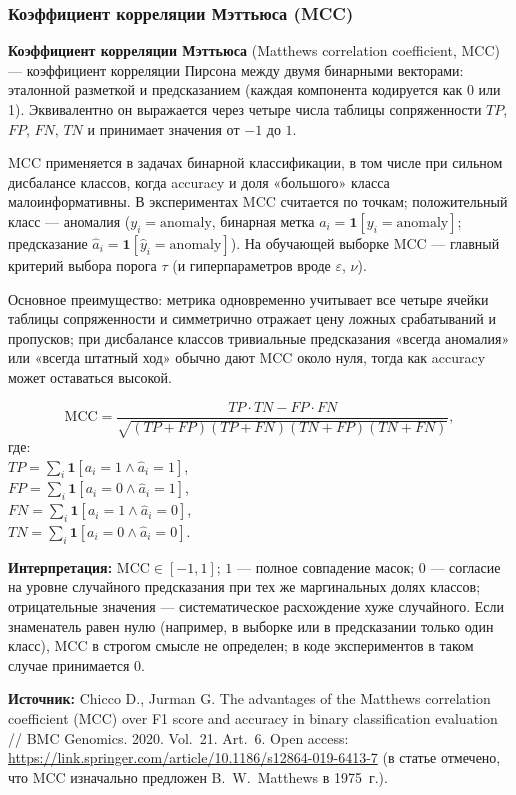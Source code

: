 \documentclass[a4paper,12pt]{report}
\begin{document}
	\subsubsection*{Коэффициент корреляции Мэттьюса (MCC)}
	\textbf{Коэффициент корреляции Мэттьюса} (Matthews correlation coefficient, MCC) --- коэффициент корреляции Пирсона между двумя бинарными векторами: эталонной разметкой и предсказанием (каждая компонента кодируется как 0 или 1). Эквивалентно он выражается через четыре числа таблицы сопряженности $TP$, $FP$, $FN$, $TN$ и принимает значения от $-1$ до $1$.

	MCC применяется в задачах бинарной классификации, в том числе при сильном дисбалансе классов, когда accuracy и доля «большого» класса малоинформативны. В экспериментах MCC считается по точкам; положительный класс --- аномалия ($y_i=\mathrm{anomaly}$, бинарная метка $a_i=\mathbf{1}[y_i=\mathrm{anomaly}]$; предсказание $\hat a_i=\mathbf{1}[\hat y_i=\mathrm{anomaly}]$). На обучающей выборке MCC --- главный критерий выбора порога $\tau$ (и гиперпараметров вроде $\varepsilon$, $\nu$).

	Основное преимущество: метрика одновременно учитывает все четыре ячейки таблицы сопряженности и симметрично отражает цену ложных срабатываний и пропусков; при дисбалансе классов тривиальные предсказания «всегда аномалия» или «всегда штатный ход» обычно дают MCC около нуля, тогда как accuracy может оставаться высокой.

	\begin{equation*}
		\mathrm{MCC}=\frac{TP\cdot TN - FP\cdot FN}{\sqrt{(TP+FP)(TP+FN)(TN+FP)(TN+FN)}},
	\end{equation*}
	где:\\
	$TP=\sum_i \mathbf{1}[a_i=1\land \hat a_i=1]$,\\
	$FP=\sum_i \mathbf{1}[a_i=0\land \hat a_i=1]$,\\
	$FN=\sum_i \mathbf{1}[a_i=1\land \hat a_i=0]$,\\
	$TN=\sum_i \mathbf{1}[a_i=0\land \hat a_i=0]$.

	\textbf{Интерпретация:} $\mathrm{MCC}\in[-1,1]$; $1$ --- полное совпадение масок; $0$ --- согласие на уровне случайного предсказания при тех же маргинальных долях классов; отрицательные значения --- систематическое расхождение хуже случайного. Если знаменатель равен нулю (например, в выборке или в предсказании только один класс), MCC в строгом смысле не определен; в коде экспериментов в таком случае принимается $0$.

	\textbf{Источник:} Chicco D., Jurman G. The advantages of the Matthews correlation coefficient (MCC) over F1 score and accuracy in binary classification evaluation // BMC Genomics. 2020. Vol.~21. Art.~6. Open access: \url{https://link.springer.com/article/10.1186/s12864-019-6413-7} (в статье отмечено, что MCC изначально предложен B.~W.~Matthews в 1975~г.).
\end{document}
